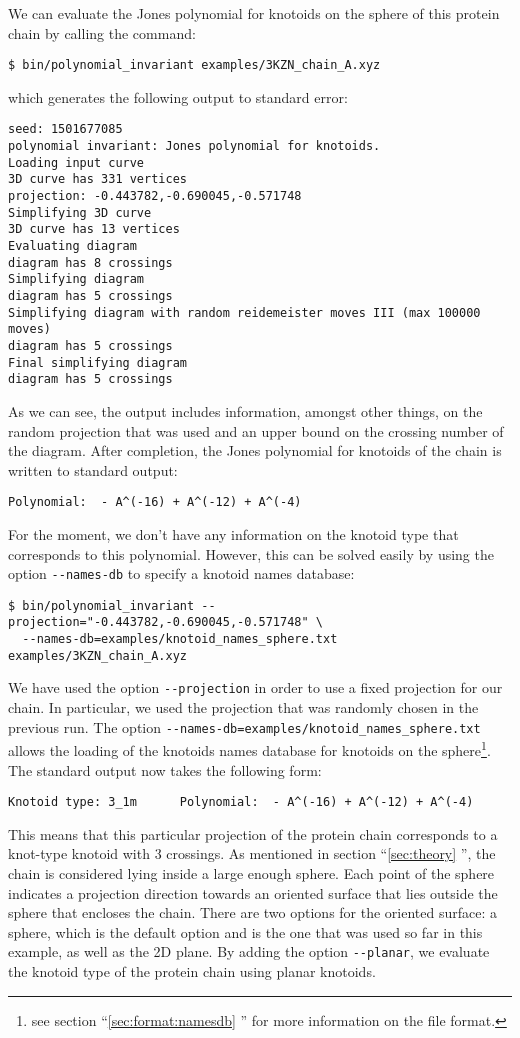 We can evaluate the Jones polynomial for knotoids on the sphere of this protein chain by calling the command:
\begin{lstlisting}
$ bin/polynomial_invariant examples/3KZN_chain_A.xyz 
\end{lstlisting}
which generates the following output to standard error:
\begin{lstlisting}
seed: 1501677085
polynomial invariant: Jones polynomial for knotoids.
Loading input curve
3D curve has 331 vertices
projection: -0.443782,-0.690045,-0.571748
Simplifying 3D curve
3D curve has 13 vertices
Evaluating diagram
diagram has 8 crossings
Simplifying diagram
diagram has 5 crossings
Simplifying diagram with random reidemeister moves III (max 100000 moves)
diagram has 5 crossings
Final simplifying diagram
diagram has 5 crossings
\end{lstlisting}
As we can see, the output includes information, amongst other things, on the random projection that was used and an upper bound on the crossing number of the diagram. After completion, the Jones polynomial for knotoids of the chain is written to standard output:
\begin{lstlisting}
Polynomial:  - A^(-16) + A^(-12) + A^(-4)
\end{lstlisting}
For the moment, we don't have any information on the knotoid type that corresponds to this polynomial. However, this can be solved easily by using the option \lstinline{--names-db} to specify a knotoid names database:
\begin{lstlisting}
$ bin/polynomial_invariant --projection="-0.443782,-0.690045,-0.571748" \
  --names-db=examples/knotoid_names_sphere.txt examples/3KZN_chain_A.xyz
\end{lstlisting}
We have used the option \lstinline{--projection} in order to use a fixed projection for our chain. In particular, we used the projection that was randomly chosen in the previous run. The option \lstinline{--names-db=examples/knotoid_names_sphere.txt} allows the loading of the knotoids names database for knotoids on the sphere\footnote{see section ``\ref{sec:format:namesdb} '' for more information on the file format.}. The standard output now takes the following form:
\begin{lstlisting}
Knotoid type: 3_1m      Polynomial:  - A^(-16) + A^(-12) + A^(-4)
\end{lstlisting}
This means that this particular projection of the protein chain corresponds to a knot-type knotoid with 3 crossings. As mentioned in section ``\ref{sec:theory} '', the chain is considered lying inside a large enough sphere. Each point of the sphere indicates a projection direction towards an oriented surface that lies outside the sphere that encloses the chain. There are two options for the oriented surface: a sphere, which is the default option and is the one that was used so far in this example, as well as the 2D plane. By adding the option \lstinline{--planar}, we evaluate the knotoid type of the protein chain using planar knotoids.
